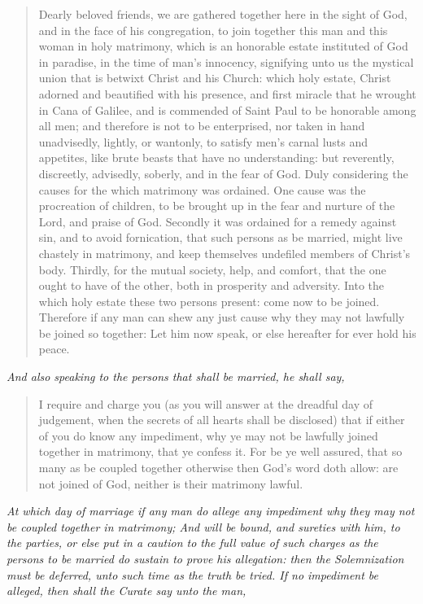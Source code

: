 \documentclass[
]{book}
\begin{document}
\begin{quote}
Dearly beloved friends, we are gathered together here in the sight of God, and in the face of his congregation, to join together this man and this woman in holy matrimony, which is an honorable estate instituted of God in paradise, in the time of man's innocency, signifying unto us the mystical union that is betwixt Christ and his Church: which holy estate, Christ adorned and beautified with his presence, and first miracle that he wrought in Cana of Galilee, and is commended of Saint Paul to be honorable among all men; and therefore is not to be enterprised, nor taken in hand unadvisedly, lightly, or wantonly, to satisfy men's carnal lusts and appetites, like brute beasts that have no understanding: but reverently, discreetly, advisedly, soberly, and in the fear of God. Duly considering the causes for the which matrimony was ordained. One cause was the procreation of children, to be brought up in the fear and nurture of the Lord, and praise of God. Secondly it was ordained for a remedy against sin, and to avoid fornication, that such persons as be married, might live chastely in matrimony, and keep themselves undefiled members of Christ's body. Thirdly, for the mutual society, help, and comfort, that the one ought to have of the other, both in prosperity and adversity. Into the which holy estate these two persons present: come now to be joined. Therefore if any man can shew any just cause why they may not lawfully be joined so together: Let him now speak, or else hereafter for ever hold his peace.
\end{quote}

\emph{And also speaking to the persons that shall be married, he shall say,}

\begin{quote}
I require and charge you (as you will answer at the dreadful day of judgement, when the secrets of all hearts shall be disclosed) that if either of you do know any impediment, why ye may not be lawfully joined together in matrimony, that ye confess it. For be ye well assured, that so many as be coupled together otherwise then God's word doth allow: are not joined of God, neither is their matrimony lawful.
\end{quote}

\emph{At which day of marriage if any man do allege any impediment why they may not be coupled together in matrimony; And will be bound, and sureties with him, to the parties, or else put in a caution to the full value of such charges as the persons to be married do sustain to prove his allegation: then the Solemnization must be deferred, unto such time as the truth be tried. If no impediment be alleged, then shall the Curate say unto the man,}
\end{document}
